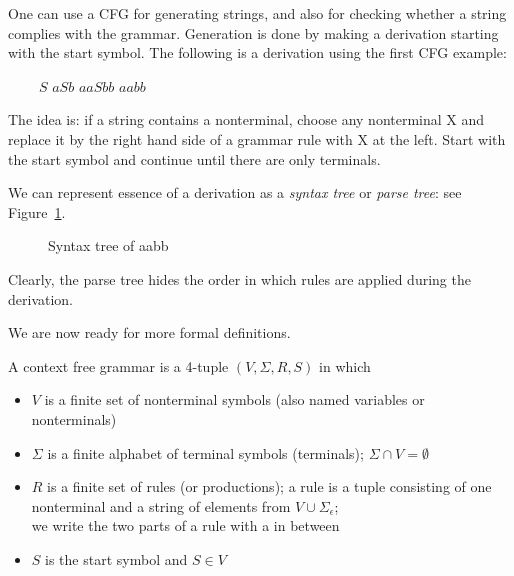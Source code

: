One can use a CFG for generating strings, and also for checking
whether a string complies with the grammar. Generation is done by
making a derivation starting with the start symbol. The following is a
derivation using the first CFG example:

$~~~~~~~~~~S$ \rpijl $aSb$ \rpijl $aaSbb$ \rpijl $aabb$

The idea is: if a string contains a nonterminal, choose any
nonterminal X and replace it by the right hand side of a grammar rule
with X at the left. Start with the start symbol and continue until
there are only terminals.

We can represent essence of a derivation as a {\em syntax tree} or
{\em parse tree}: see Figure~\ref{parsetree1}.

\medskip
\begin{figure}[h]
\caption{Syntax tree of aabb \label{parsetree1}}
\end{figure}

Clearly, the parse tree hides the order in which rules are applied
during the derivation.

We are now ready for more formal definitions.

\begin{definition}
A context free grammar is a 4-tuple $(V,\Sigma,R,S)$ in which
\begin{itemize}
\item
$V$ is a finite set of nonterminal symbols (also named variables or
  nonterminals)
\item
$\Sigma$ is a finite alphabet of terminal symbols (terminals); $\Sigma
  \cap V = \emptyset$
\item
$R$ is a finite set of rules (or productions); a rule is a tuple
  consisting of one nonterminal and a string of elements from $V \cup
  \Sigma_\epsilon$; \\ we write the two parts of a rule with a \rpijl
  in between
\item
$S$ is the start symbol and $S \in V$
\end{itemize}
\end{definition}

